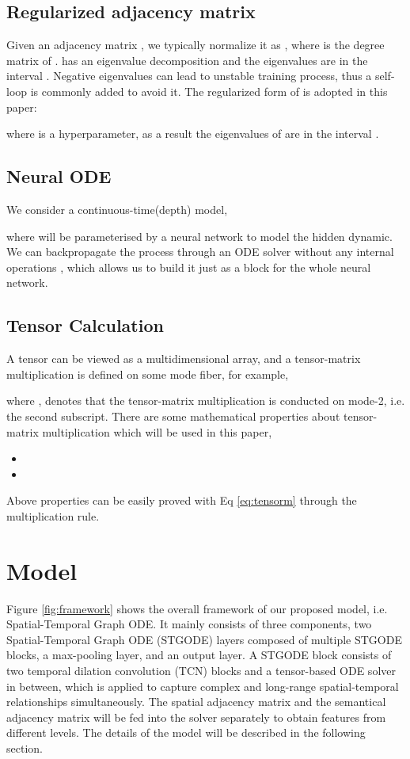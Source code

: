 \documentclass[sigconf]{acmart}
\theoremstyle{definition}
\begin{document}
\subsection{Regularized adjacency matrix}
Given an adjacency matrix , we typically normalize it as , where  is the degree matrix of .  has an eigenvalue decomposition  \cite{chung1997spectral} and the eigenvalues are in the interval
. Negative eigenvalues can lead to unstable training process, thus a self-loop is commonly added to avoid it. The regularized form \cite{kipf2016semi} of  is adopted in this paper:

where  is a hyperparameter, as a result the eigenvalues of  are in the interval .

\subsection{Neural ODE}
We consider a continuous-time(depth) model,

where  will be parameterised by a neural network to model the hidden dynamic. We can backpropagate the process through an ODE solver without any internal operations \cite{chen2018neural}, which allows us to build it just as a block for the whole neural network.

\subsection{Tensor Calculation}
A tensor  can be viewed as a multidimensional array, and a tensor-matrix multiplication is defined on some mode fiber, for example,

where ,  denotes that the tensor-matrix multiplication is conducted on mode-2, i.e. the second subscript. There are some mathematical properties about tensor-matrix multiplication which will be used in this paper,
\begin{itemize}
  \item 
  \item 
\end{itemize}
Above properties can be easily proved with Eq \ref{eq:tensorm} through the multiplication rule.


\section{Model}
Figure \ref{fig:framework} shows the overall framework of our proposed model, i.e. Spatial-Temporal Graph ODE. It mainly consists of three components, two Spatial-Temporal Graph ODE (STGODE) layers composed of multiple STGODE blocks, a max-pooling layer, and an output layer. A STGODE block consists of two temporal dilation convolution (TCN) blocks and a tensor-based ODE solver in between, which is applied to capture complex and long-range spatial-temporal relationships simultaneously. The spatial adjacency matrix and the semantical adjacency matrix will be fed into the solver separately to obtain features from different levels. The details of the model will be described in the following section.
\end{document}
